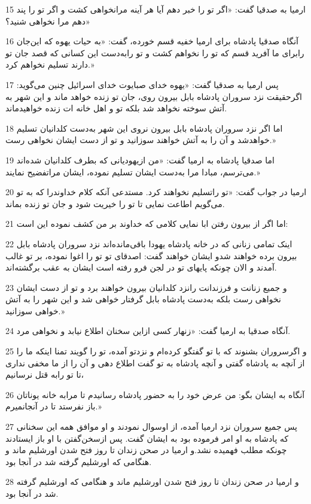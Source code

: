 \par 15 ارمیا به صدقیا گفت: «اگر تو را خبر دهم آیا هر آینه مرانخواهی کشت و اگر تو را پند دهم مرا نخواهی شنید؟»
\par 16 آنگاه صدقیا پادشاه برای ارمیا خفیه قسم خورده، گفت: «به حیات یهوه که این‌جان رابرای ما آفرید قسم که تو را نخواهم کشت و تو رابه‌دست این کسانی که قصد جان تو دارند تسلیم نخواهم کرد.»
\par 17 پس ارمیا به صدقیا گفت: «یهوه خدای صبایوت خدای اسرائیل چنین می‌گوید: اگرحقیقت نزد سروران پادشاه بابل بیرون روی، جان تو زنده خواهد ماند و این شهر به آتش سوخته نخواهد شد بلکه تو و اهل خانه ات زنده خواهیدماند.
\par 18 اما اگر نزد سروران پادشاه بابل بیرون نروی این شهر به‌دست کلدانیان تسلیم خواهدشد و آن را به آتش خواهند سوزانید و تو از دست ایشان نخواهی رست.»
\par 19 اما صدقیا پادشاه به ارمیا گفت: «من ازیهودیانی که بطرف کلدانیان شده‌اند می‌ترسم، مبادا مرا به‌دست ایشان تسلیم نموده، ایشان مراتفضیح نمایند.»
\par 20 ارمیا در جواب گفت: «تو راتسلیم نخواهند کرد. مستدعی آنکه کلام خداوندرا که به تو می‌گویم اطاعت نمایی تا تو را خیریت شود و جان تو زنده بماند.
\par 21 اما اگر از بیرون رفتن ابا نمایی کلامی که خداوند بر من کشف نموده این است:
\par 22 اینک تمامی زنانی که در خانه پادشاه یهودا باقی‌مانده‌اند نزد سروران پادشاه بابل بیرون برده خواهند شدو ایشان خواهند گفت: اصدقای تو تو را اغوا نموده، بر تو غالب آمدند و الان چونکه پایهای تو در لجن فرو رفته است ایشان به عقب برگشته‌اند.
\par 23 و جمیع زنانت و فرزندانت رانزد کلدانیان بیرون خواهند برد و تو از دست ایشان نخواهی رست بلکه به‌دست پادشاه بابل گرفتار خواهی شد و این شهر را به آتش خواهی سوزانید.»
\par 24 آنگاه صدقیا به ارمیا گفت: «زنهار کسی ازاین سخنان اطلاع نیابد و نخواهی مرد.
\par 25 و اگرسروران بشنوند که با تو گفتگو کرده‌ام و نزدتو آمده، تو را گویند تمنا اینکه ما را از آنچه به پادشاه گفتی و آنچه پادشاه به تو گفت اطلاع دهی و آن را از ما مخفی نداری تا تو رابه قتل نرسانیم،
\par 26 آنگاه به ایشان بگو: من عرض خود را به حضور پادشاه رسانیدم تا مرابه خانه یوناتان باز نفرستد تا در آنجانمیرم.»
\par 27 پس جمیع سروران نزد ارمیا آمده، از اوسوال نمودند و او موافق همه این سخنانی که پادشاه به او امر فرموده بود به ایشان گفت. پس ازسخن‌گفتن با او باز ایستادند چونکه مطلب فهمیده نشد.و ارمیا در صحن زندان تا روز فتح شدن اورشلیم ماند و هنگامی که اورشلیم گرفته شد در آنجا بود.
\par 28 و ارمیا در صحن زندان تا روز فتح شدن اورشلیم ماند و هنگامی که اورشلیم گرفته شد در آنجا بود.
 
